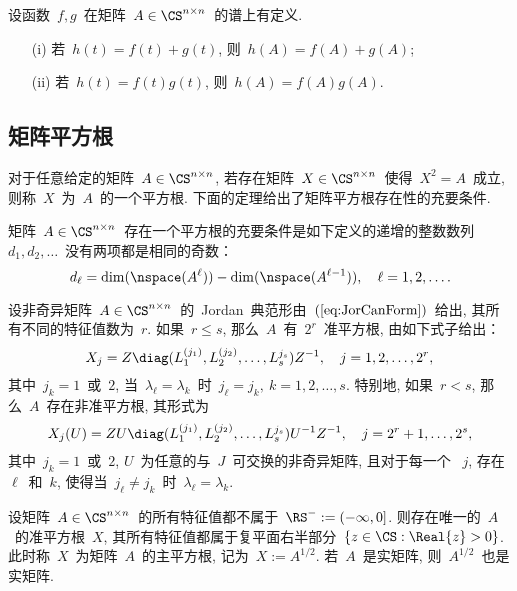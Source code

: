 \begin{theorem}
\label{th:MatFun_sum_product} 设函数~$f,g$~在矩阵~$A\in\CS^{n\times
n}$~的谱上有定义.
\begin{enumerate}
\item[\textup{(i)}]
若~$h(t) = f(t) + g(t)$, 则~$h(A) = f(A)+g(A)$;
\item[\textup{(ii)}]
若~$h(t)=f(t)g(t)$, 则~$h(A)=f(A)g(A)$.
\end{enumerate}
\end{theorem}






\subsection{矩阵平方根}

对于任意给定的矩阵~$A\in\CS^{n\times n}$,
若存在矩阵~$X\in\CS^{n\times n}$~使得~$X^2 = A$~成立,
则称~$X$~为~$A$~的一个平方根.
下面的定理给出了矩阵平方根存在性的充要条件.

\begin{theorem}
\label{th:MatSquRoot_Existence} 矩阵~$A\in\CS^{n\times
n}$~存在一个平方根的充要条件是如下定义的递增的整数数列~$d_1,
d_2,\ldots$~没有两项都是相同的奇数：
$$
d_\ell = \dim(\nspace(A^\ell)) - \dim(\nspace(A^{\ell-1})), \ \ \
\ell = 1,2,\ldots.
$$
\end{theorem}

\begin{theorem}
\label{th:MatSquRoot_Classification} 设非奇异矩阵~$A\in\CS^{n\times
n}$~的~Jordan~典范形由~$(\ref{eq:JorCanForm})$~给出,
其所有不同的特征值数为~$r$. 如果~$r\leq s$,
那么~$A$~有~$2^r$~准平方根, 由如下式子给出：
$$
X_j = Z \diag(L_1^{(j_1)},L_2^{(j_2)},\ldots,L_s^{j_s})Z^{-1},\ \ \
j = 1, 2, \ldots, 2^r,
$$
其中~$j_k = 1$~或~$2$, 当~$\lambda_\ell = \lambda_k$~时~$j_\ell =
j_k,\ k=1,2,\ldots,s$. 特别地, 如果~$r<s$, 那么~$A$~存在非准平方根,
其形式为
$$
X_j(U) =
ZU\diag(L_1^{(j_1)},L_2^{(j_2)},\ldots,L_s^{j_s})U^{-1}Z^{-1}, \ \ \
j=2^r+1, \ldots, 2^s,
$$
其中~$j_k = 1$~或~$2$, $U$~为任意的与~$J$~可交换的非奇异矩阵,
且对于每一个 ~$j$, 存在~$\ell$~和~$k$, 使得当~$j_\ell\neq
j_k$~时~$\lambda_\ell = \lambda_k$.
\end{theorem}



\begin{theorem}
\label{th:MatSquRoot_Principal} 设矩阵~$A\in\CS^{n\times
n}$~的所有特征值都不属于~$\RS^- := (-\infty,0]$.
则存在唯一的~$A$~的准平方根~$X$,
其所有特征值都属于复平面右半部分~$\{z\in\CS: \Real{z}>0\}$.
此时称~$X$~为矩阵~$A$~的主平方根, 记为~$X := A^{1/2}$.
若~$A$~是实矩阵, 则~$A^{1/2}$~也是实矩阵.
\end{theorem}


